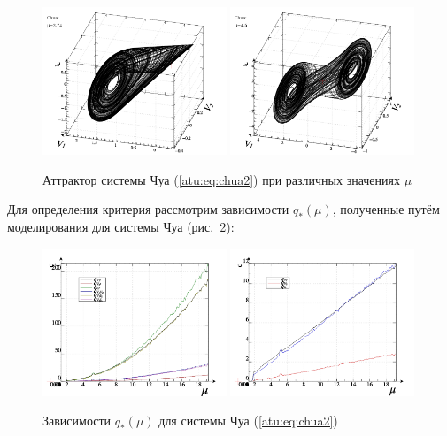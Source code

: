 \documentclass[a4paper,12pt]{article}
\begin{document}
\begin{figure}[htb!]
\centerline{
  \includegraphics[width=0.49\textwidth]{p/cha/chua/chua_1-p_xyz_mu=2x74.png}
  \includegraphics[width=0.49\textwidth]{p/cha/chua/chua_1-p_xyz_mu=4x50.png}
}
\caption{Аттрактор системы Чуа (\ref{atu:eq:chua2}) при различных значениях $\mu$}
\label{atu:f:chua_phase}
\end{figure}


Для определения критерия рассмотрим зависимости
$q_{*}(\mu) $, полученные путём моделирования
для системы Чуа (рис.~\ref{atu:f:chua_q}):

\begin{figure}[htb!]
\centerline{
  \includegraphics[width=0.49\textwidth]{p/cha/chua/chua_q-p_mu2.png}
  \includegraphics[width=0.49\textwidth]{p/cha/chua/chua_q-p_mu1.png}
}
  \caption{Зависимости $q_{*}(\mu) $ для системы Чуа (\ref{atu:eq:chua2})}
\label{atu:f:chua_q}
\end{figure}
\end{document}
